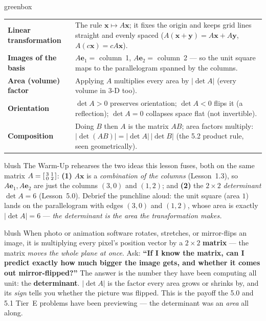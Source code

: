 \documentclass[10pt]{article}
\newcommand{\xx}{\mathbf{x}}
\newcommand{\yy}{\mathbf{y}}
\newcommand{\ee}{\mathbf{e}}
\begin{document}
\begin{skillbox}{greenbox}
\renewcommand{\arraystretch}{1.3}
\begin{tabularx}{\linewidth}{@{}l X@{}}
\textbf{Linear transformation} & The rule $\xx\mapsto A\xx$; it fixes the origin and keeps grid lines straight and evenly spaced ($A(\xx+\yy)=A\xx+A\yy$, $A(c\xx)=cA\xx$). \\
\textbf{Images of the basis} & $A\ee_1=$ column~1, $A\ee_2=$ column~2 --- so the unit square maps to the parallelogram spanned by the columns. \\
\textbf{Area (volume) factor} & Applying $A$ multiplies every area by $|\det A|$ (every volume in 3-D too). \\
\textbf{Orientation} & $\det A>0$ preserves orientation; $\det A<0$ flips it (a reflection); $\det A=0$ collapses space flat (not invertible). \\
\textbf{Composition} & Doing $B$ then $A$ is the matrix $AB$; area factors multiply: $|\det(AB)|=|\det A|\,|\det B|$ (the 5.2 product rule, seen geometrically). \\
\end{tabularx}
\end{skillbox}

\begin{fixedskillbox}{blush}
    The Warm-Up rehearses the two ideas this lesson fuses, both on the same matrix
    $A=\begin{bsmallmatrix} 3 & 1\\ 0 & 2 \end{bsmallmatrix}$:
    \textbf{(1)} $A\xx$ is a \emph{combination of the columns} (Lesson~1.3), so $A\ee_1,A\ee_2$ are just
    the columns $(3,0)$ and $(1,2)$; and \textbf{(2)} the $2\times2$ \emph{determinant} $\det A=6$
    (Lesson~5.0). Debrief the punchline aloud: the unit square (area $1$) lands on the parallelogram with
    edges $(3,0)$ and $(1,2)$, whose area is exactly $|\det A|=6$ --- \emph{the determinant is the area
    the transformation makes.}
\end{fixedskillbox}

\begin{skillbox}[Hook]{blush}
    When photo or animation software rotates, stretches, or mirror-flips an image, it is multiplying
    every pixel's position vector by a $2\times2$ \textbf{matrix} --- the matrix \emph{moves the whole
    plane at once}. Ask: \textbf{``If I know the matrix, can I predict exactly how much bigger the image
    gets, and whether it comes out mirror-flipped?''} The answer is the number they have been computing
    all unit: the \textbf{determinant}. $|\det A|$ is the factor every area grows or shrinks by, and its
    \emph{sign} tells you whether the picture was flipped. This is the payoff the 5.0 and 5.1 Tier~E
    problems have been previewing --- the determinant was an \emph{area} all along.
\end{skillbox}
\end{document}
